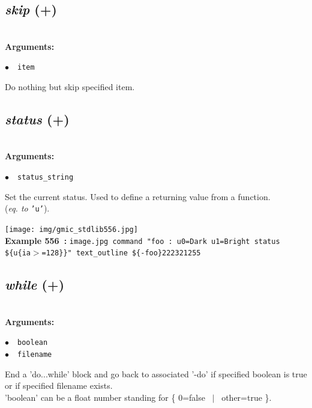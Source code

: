 \documentclass[a4paper,10.5pt,twoside]{book}
\def\comma{\discretionary{,}{}{,}}
\newcommand{\Cb}[1]{\textcolor{cb}{#1}}
\begin{document}
\subsection{\emph{skip} (+)}\vspace*{-0.7em}
~\\\textbf{\Cb{Arguments: }}\begin{flushleft}
{\small \Cb{\hspace*{0.5cm}$\bullet$~~\texttt{item}}}\end{flushleft}
Do nothing but skip specified item.


\subsection{\emph{status} (+)}\vspace*{-0.7em}
~\\\textbf{\Cb{Arguments: }}\begin{flushleft}
{\small \Cb{\hspace*{0.5cm}$\bullet$~~\texttt{status\_string}}}\end{flushleft}
Set the current status. Used to define a returning value from a function.
~\\(\emph{eq. to} {\small \texttt{'u'}}).
\begin{center}\texttt{[image: img/gmic\_stdlib556.jpg]}\\
{\footnotesize \textbf{Example 556~:} \texttt{image.jpg command "foo : u0=Dark u1=Bright status \$\{u\{ia$>$=128\}\}" text\_outline \$\{-foo\}{\comma}2{\comma}2{\comma}23{\comma}2{\comma}1{\comma}255}}
\end{center}

\subsection{\emph{while} (+)}\vspace*{-0.7em}
~\\\textbf{\Cb{Arguments: }}\begin{flushleft}
{\small \Cb{\hspace*{0.5cm}$\bullet$~~\texttt{boolean}}}~~~\\
{\small \Cb{\hspace*{0.5cm}$\bullet$~~\texttt{filename}}}\end{flushleft}
End a 'do...while' block and go back to associated '-do'
if specified boolean is true or if specified filename exists.
~\\'boolean' can be a float number standing for \{ 0=false ~$|$~ other=true \}.
\end{document}
